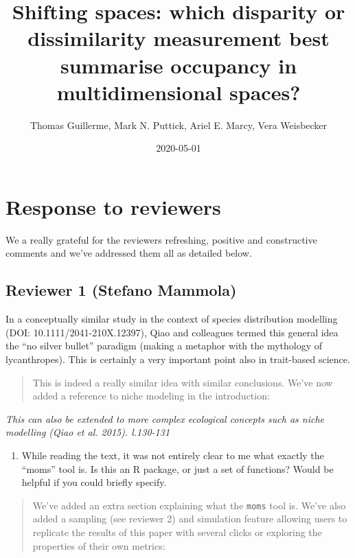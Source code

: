 \documentclass[]{article}
\title{Shifting spaces: which disparity or dissimilarity measurement best
summarise occupancy in multidimensional spaces?}
\author{Thomas Guillerme, Mark N. Puttick, Ariel E. Marcy, Vera Weisbecker}
\date{2020-05-01}
\providecommand{\tightlist}{%
  \setlength{\itemsep}{0pt}\setlength{\parskip}{0pt}}
\begin{document}
\maketitle

\section{Response to reviewers}\label{response-to-reviewers}

We a really grateful for the reviewers refreshing, positive and
constructive comments and we've addressed them all as detailed below.

\subsection{Reviewer 1 (Stefano
Mammola)}\label{reviewer-1-stefano-mammola}

In a conceptually similar study in the context of species distribution
modelling (DOI: 10.1111/2041-210X.12397), Qiao and colleagues termed
this general idea the ``no silver bullet'' paradigm (making a metaphor
with the mythology of lycanthropes). This is certainly a very important
point also in trait-based science.

\begin{quote}
This is indeed a really similar idea with similar conclusions. We've now
added a reference to niche modeling in the introduction:
\end{quote}

\textit{This can also be extended to more complex ecological concepts such as
niche modelling (Qiao et al. 2015). l.130-131}

\begin{enumerate}
\def\labelenumi{\arabic{enumi})}
\tightlist
\item
  While reading the text, it was not entirely clear to me what exactly
  the ``moms'' tool is. Is this an R package, or just a set of
  functions? Would be helpful if you could briefly specify.
\end{enumerate}

\begin{quote}
We've added an extra section explaining what the \texttt{moms} tool is.
We've also added a sampling (see reviewer 2) and simulation feature
allowing users to replicate the results of this paper with several
clicks or exploring the properties of their own metrics:
\end{quote}
\end{document}
